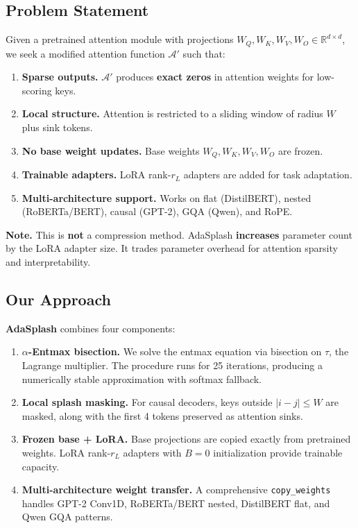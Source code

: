 \subsection{Problem Statement}

Given a pretrained attention module with projections 
$W_Q, W_K, W_V, W_O \in \mathbb{R}^{d \times d}$, we seek a modified attention 
function $\mathcal{A}'$ such that:

\begin{enumerate}
\item \textbf{Sparse outputs.} $\mathcal{A}'$ produces \textbf{exact zeros} in attention
  weights for low-scoring keys.
\item \textbf{Local structure.} Attention is restricted to a sliding window of radius
  $W$ plus sink tokens.
\item \textbf{No base weight updates.} Base weights $W_Q, W_K, W_V, W_O$ are frozen.
\item \textbf{Trainable adapters.} LoRA rank-$r_L$ adapters are added for task adaptation.
\item \textbf{Multi-architecture support.} Works on flat (DistilBERT), nested
  (RoBERTa/BERT), causal (GPT-2), GQA (Qwen), and RoPE.

\end{enumerate}
\textbf{Note.} This is \textbf{not} a compression method. AdaSplash \textbf{increases} 
parameter count by the LoRA adapter size. It trades parameter overhead for 
attention sparsity and interpretability.

\subsection{Our Approach}

\textbf{AdaSplash} combines four components:

\begin{enumerate}
\item \textbf{$\alpha$-Entmax bisection.} We solve the entmax equation via bisection on
  $\tau$, the Lagrange multiplier. The procedure runs for 25 iterations,
  producing a numerically stable approximation with softmax fallback.

\item \textbf{Local splash masking.} For causal decoders, keys outside $|i - j| \leq W$
  are masked, along with the first 4 tokens preserved as attention sinks.

\item \textbf{Frozen base + LoRA.} Base projections are copied exactly from pretrained
  weights. LoRA rank-$r_L$ adapters with $B = 0$ initialization provide
  trainable capacity.

\item \textbf{Multi-architecture weight transfer.} A comprehensive \texttt{copy\_weights}
  handles GPT-2 Conv1D, RoBERTa/BERT nested, DistilBERT flat, and Qwen
  GQA patterns.

\end{enumerate}
